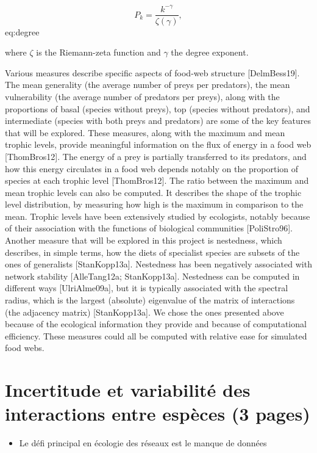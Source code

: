 $$ P_k = \frac{k^{-\gamma}}{\zeta(\gamma)},$$ {eq:degree}

where $\zeta$ is the Riemann-zeta function and $\gamma$ the degree exponent.

Various measures describe specific aspects of food-web structure [DelmBess19].
The mean
generality (the average number of preys per predators), the mean vulnerability
(the average number of predators per preys), along with the proportions of basal
(species without preys), top (species without predators), and intermediate
(species with both preys and predators) are some of the key features that will
be explored. These measures, along with the maximum and mean trophic levels,
provide meaningful information on the flux of energy in a food web
[ThomBros12]. The energy of a prey is partially transferred to its predators,
and how this energy circulates in a food web depends notably on the proportion
of species at each trophic level [ThomBros12]. The ratio between the maximum
and mean trophic levels can also be computed. It describes the shape of the
trophic level distribution, by measuring how high is the maximum in comparison
to the mean. Trophic levels have been extensively studied by ecologists, notably
because of their association with the functions of biological communities
[PoliStro96]. Another measure that will be explored in this project is
nestedness, which describes, in simple terms, how the diets of specialist
species are subsets of the ones of generalists [StanKopp13a]. Nestedness has
been negatively associated with network stability [AlleTang12a; StanKopp13a].
Nestedness can be computed in different ways [UlriAlme09a], but it is typically
associated with the spectral radius, which is the largest (absolute) eigenvalue
of the matrix of interactions (the adjacency matrix) [StanKopp13a]. We chose the ones presented
above because of the ecological information they provide and because of
computational efficiency. These measures could all be computed with relative
ease for simulated food webs.


\section{Incertitude et variabilité des interactions entre espèces (3 pages)}

\begin{itemize}
    \item Le défi principal en écologie des réseaux est le manque de données
\end{itemize}

